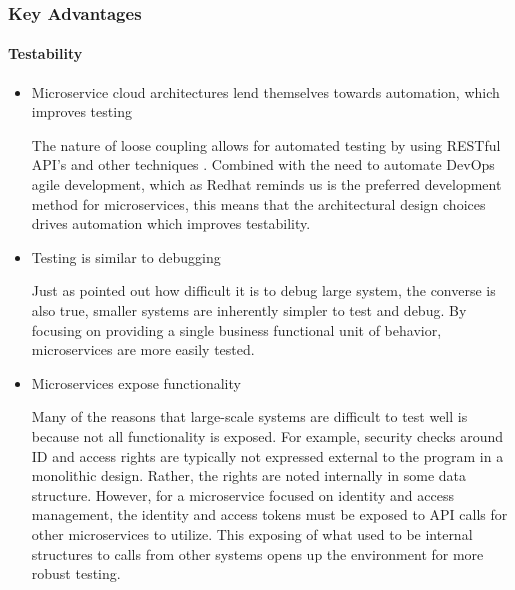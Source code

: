 \begin{frame}
  \frametitle{Key Advantages}
  \framesubtitle{Testability}
  \begin{itemize}
    \item<1-> Microservice cloud architectures lend themselves towards automation, which improves testing

           {\scriptsize{The nature of loose coupling allows for automated testing by using RESTful API's and other techniques \parencite{redhatWhatAreMicroservices}. Combined with the need to automate DevOps agile development, which as Redhat reminds us is the preferred development method for microservices, this means that the architectural design choices drives automation which improves testability. }}

    \item<2-> Testing is similar to debugging

           {\scriptsize{Just as \textcite{ahnScalableTemporalOrder2009} pointed out how difficult it is to debug large system, the converse is also true, smaller systems are inherently simpler to test and debug. By focusing on providing a single business functional unit of behavior, microservices are more easily tested. }}

    \item<1-> Microservices expose functionality

           {\scriptsize{Many of the reasons that large-scale systems are difficult to test well is because not all functionality is exposed. For example, security checks around ID and access rights are typically not expressed external to the program in a monolithic design. Rather, the rights are noted internally in some data structure. However, for a microservice focused on identity and access management, the identity and access tokens must be exposed to API calls for other microservices to utilize. This exposing of what used to be internal structures to calls from other systems opens up the environment for more robust testing.}}


  \end{itemize}
\end{frame}
